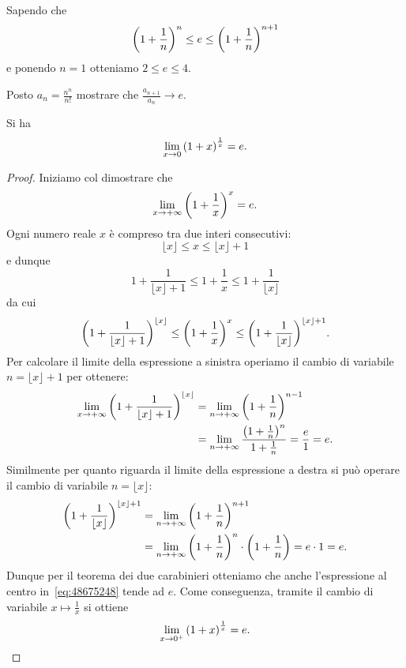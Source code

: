 Sapendo che
\[
  {\left( 1+\frac 1 n \right)}^n \le e \le {\left( 1+\frac 1 n \right)}^{n+1}
\]
e ponendo $n=1$ otteniamo $2\le e \le 4$.

\begin{exercise}\label{ex:4876765}
Posto $a_n = \frac{n^n}{n!}$ mostrare che $\frac{a_{n+1}}{a_n} \to e$.
\end{exercise}


\begin{theorem}
Si ha 
\[
\lim_{x\to 0}  {\left( 1 + x \right)}^{\frac 1 {x}} = e.
\]
\end{theorem}
%
\begin{proof}
  Iniziamo col dimostrare che 
  \begin{equation}\label{eq:2373793}
    \lim_{x\to +\infty} {\left( 1+\frac 1 x \right)}^x = e.
  \end{equation}
  Ogni numero reale $x$ è compreso tra due interi consecutivi:
  \[
      \lfloor x \rfloor \le x \le \lfloor x\rfloor + 1
  \]
  e dunque
  \[
    1+\frac{1}{\lfloor x\rfloor +1 } 
    \le 1 + \frac 1 x 
    \le 1 + \frac 1 {\lfloor x\rfloor} 
  \]
  da cui 
  \begin{equation}\label{eq:48675248}
    {\left( 1+\frac{1}{\lfloor x\rfloor +1 } \right)}^{\lfloor x\rfloor} 
    \le {\left( 1 + \frac 1 x  \right)}^x
    \le {\left( 1 + \frac 1 {\lfloor x\rfloor} \right)}^{\lfloor x\rfloor +1}. 
  \end{equation}
  Per calcolare il limite della espressione a sinistra 
  operiamo il cambio di variabile $n=\lfloor x\rfloor + 1$ per 
  ottenere:
  \begin{align*}
  \lim_{x\to+\infty} {\left( 1+\frac{1}{\lfloor x\rfloor +1 } \right)}^{\lfloor x\rfloor}
  &= \lim_{n\to +\infty} {\left( 1+\frac 1 n \right)}^{n-1}\\
  &= \lim_{n\to +\infty} \frac{{\left( 1+\frac 1 n \right)}^{n}}{1+\frac 1 n}
   = \frac{e}{1} = e.
  \end{align*}
  Similmente per quanto riguarda il limite della espressione a destra 
  si può operare il cambio di variabile $n=\lfloor x\rfloor$:
  \begin{align*}
    {\left( 1 + \frac 1 {\lfloor x\rfloor} \right)}^{\lfloor x\rfloor +1}
    &= \lim_{n\to+\infty} {\left( 1+\frac 1 n \right)}^{n+1} \\
    &= \lim_{n\to+\infty} {\left( 1+\frac 1 n \right)}^n 
    \cdot {\left( 1 + \frac 1 n \right)} 
    = e \cdot 1 = e.
  \end{align*}
  Dunque per il teorema dei due carabinieri otteniamo
  che anche l'espressione 
  al centro in~\eqref{eq:48675248} tende ad $e$.
  Come conseguenza, tramite il cambio di variabile $x\mapsto \frac 1 x$
  si ottiene 
  \[
  \lim_{x\to 0^+}{\left( 1+x \right)}^{\frac 1 x} = e.  
  \]


\end{proof}
